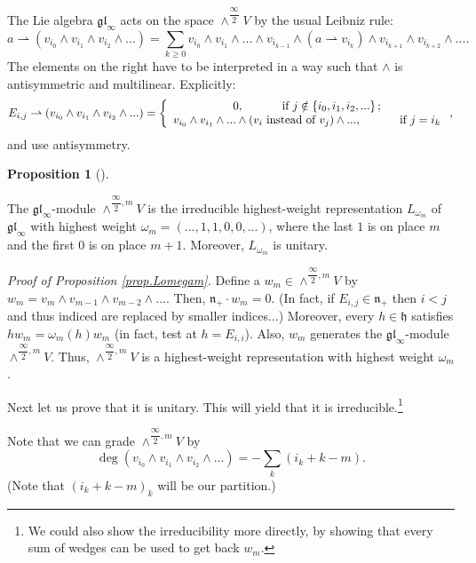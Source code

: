 \documentclass
[numbers=enddot,12pt,final,onecolumn,german,notitlepage]{scrartcl}%
\theoremstyle{definition}
\newtheorem{prop}[theo]{Proposition}
\newenvironment{proposition}[1][]
{\begin{prop}[#1]\begin{leftbar}}
{\end{leftbar}\end{prop}}
\begin{document}
The Lie algebra $\mathfrak{gl}_{\infty}$ acts on the space $\wedge
^{\dfrac{\infty}{2}}V$ by the usual Leibniz rule:%
\[
a\rightharpoonup\left(  v_{i_{0}}\wedge v_{i_{1}}\wedge v_{i_{2}}%
\wedge...\right)  =\sum\limits_{k\geq0}v_{i_{0}}\wedge v_{i_{1}}%
\wedge...\wedge v_{i_{k-1}}\wedge\left(  a\rightharpoonup v_{i_{k}}\right)
\wedge v_{i_{k+1}}\wedge v_{i_{k+2}}\wedge....
\]
The elements on the right have to be interpreted in a way such that $\wedge$
is antisymmetric and multilinear. Explicitly:%
\[
E_{i,j}\rightharpoonup\left(  v_{i_{0}}\wedge v_{i_{1}}\wedge v_{i_{2}}%
\wedge...\right)  =\left\{
\begin{array}
[c]{c}%
0,\ \ \ \ \ \ \ \ \ \ \text{if }j\notin\left\{  i_{0},i_{1},i_{2},...\right\}
;\\
v_{i_{0}}\wedge v_{i_{1}}\wedge...\wedge\left(  v_{i}\text{ instead of }%
v_{j}\right)  \wedge...,\ \ \ \ \ \ \ \ \ \ \text{if }j=i_{k}%
\end{array}
\right.  ,
\]
and use antisymmetry.

\begin{proposition}
\label{prop.Lomegam}The $\mathfrak{gl}_{\infty}$-module $\wedge^{\dfrac
{\infty}{2},m}V$ is the irreducible highest-weight representation
$L_{\omega_{m}}$ of $\mathfrak{gl}_{\infty}$ with highest weight $\omega
_{m}=\left(  ...,1,1,0,0,...\right)  $, where the last $1$ is on place $m$ and
the first $0$ is on place $m+1$. Moreover, $L_{\omega_{m}}$ is unitary.
\end{proposition}

\textit{Proof of Proposition \ref{prop.Lomegam}.} Define a $w_{m}\in
\wedge^{\dfrac{\infty}{2},m}V$ by $w_{m}=v_{m}\wedge v_{m-1}\wedge
v_{m-2}\wedge...$. Then, $\mathfrak{n}_{+}\cdot w_{m}=0$. (In fact, if
$E_{i,j}\in\mathfrak{n}_{+}$ then $i<j$ and thus indiced are replaced by
smaller indices...) Moreover, every $h\in\mathfrak{h}$ satisfies
$hw_{m}=\omega_{m}\left(  h\right)  w_{m}$ (in fact, test at $h=E_{i,i}$).
Also, $w_{m}$ generates the $\mathfrak{gl}_{\infty}$-module $\wedge
^{\dfrac{\infty}{2},m}V$. Thus, $\wedge^{\dfrac{\infty}{2},m}V$ is a
highest-weight representation with highest weight $\omega_{m}$.

Next let us prove that it is unitary. This will yield that it is
irreducible.\footnote{We could also show the irreducibility more directly, by
showing that every sum of wedges can be used to get back $w_{m}$.}

Note that we can grade $\wedge^{\dfrac{\infty}{2},m}V$ by%
\[
\deg\left(  v_{i_{0}}\wedge v_{i_{1}}\wedge v_{i_{2}}\wedge...\right)
=-\sum\limits_{k}\left(  i_{k}+k-m\right)  .
\]
(Note that $\left(  i_{k}+k-m\right)  _{k}$ will be our partition.)
\end{document}
